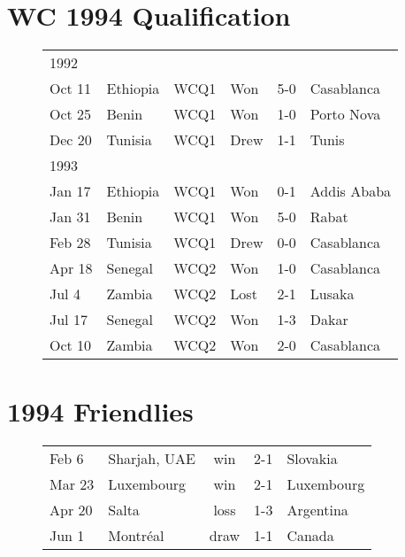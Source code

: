 \section{WC 1994 Qualification}
\begin{figure}[H]
\begin{tabular}{l l c l c l}
1992 & & & & & \\
Oct 11 & Ethiopia & WCQ1 & Won & 5-0 & Casablanca \\
Oct 25 & Benin & WCQ1 & Won & 1-0 & Porto Nova \\
Dec 20 & Tunisia & WCQ1 & Drew & 1-1 & Tunis \\
1993 & & & & & \\
Jan 17 & Ethiopia & WCQ1 & Won & 0-1 & Addis Ababa \\
Jan 31 & Benin & WCQ1 & Won & 5-0 & Rabat \\
Feb 28 & Tunisia & WCQ1 & Drew & 0-0 & Casablanca \\
Apr 18 & Senegal & WCQ2 & Won & 1-0 & Casablanca \\
Jul 4 & Zambia & WCQ2 & Lost & 2-1 & Lusaka \\
Jul 17 & Senegal & WCQ2 & Won & 1-3 & Dakar \\
Oct 10 & Zambia & WCQ2 & Won  & 2-0 & Casablanca \\
\end{tabular}
\end{figure}
\section{1994 Friendlies}
\begin{figure}[H]
\begin{tabular}{l l c c l}
Feb 6 & Sharjah, UAE & win & 2-1 & Slovakia \\
Mar 23 & Luxembourg & win & 2-1 & Luxembourg \\
Apr 20 & Salta & loss & 1-3 & Argentina \\
Jun 1 & Montr{\'e}al & draw & 1-1 & Canada \\
\end{tabular}
\end{figure}
